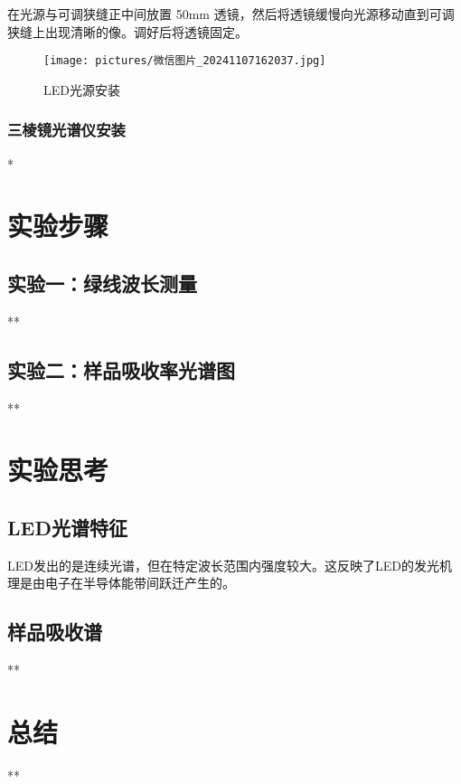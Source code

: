 \documentclass{ctexart}
\begin{document}
在光源与可调狭缝正中间放置 50mm 透镜，然后将透镜缓慢向光源移动直到可调狭缝上出现清晰的像。调好后将透镜固定。
\begin{figure}[htbp]
    \centering
    \texttt{[image: pictures/微信图片\_20241107162037.jpg]}
    \caption{LED光源安装}
\end{figure}
\subsubsection{三棱镜光谱仪安装}
*
\section{实验步骤}

\subsection{实验一：绿线波长测量}
**

\subsection{实验二：样品吸收率光谱图}
**

\section{实验思考}

\subsection{LED光谱特征}
LED发出的是连续光谱，但在特定波长范围内强度较大。这反映了LED的发光机理是由电子在半导体能带间跃迁产生的。

\subsection{样品吸收谱}
**

\section{总结}
**
\end{document}
